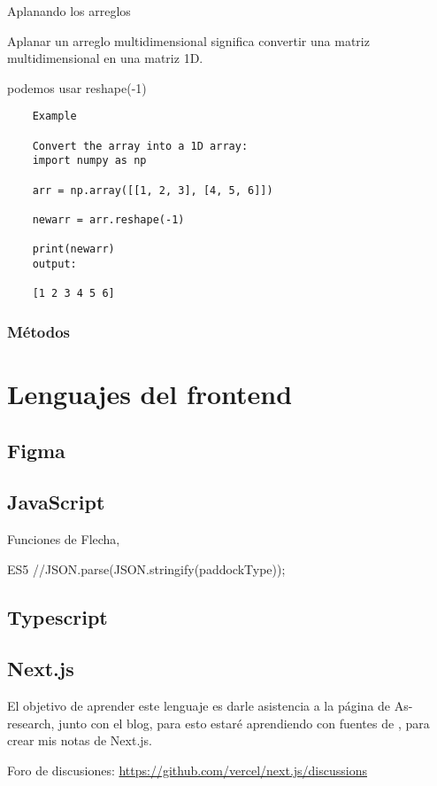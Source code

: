 Aplanando los arreglos

Aplanar un arreglo multidimensional significa convertir una matriz multidimensional en una matriz 1D.

podemos usar reshape(-1)

\begin{verbatim}
	Example
	
	Convert the array into a 1D array:
	import numpy as np
	
	arr = np.array([[1, 2, 3], [4, 5, 6]])
	
	newarr = arr.reshape(-1)
	
	print(newarr) 
	output:
	
	[1 2 3 4 5 6] 
\end{verbatim}
\section{M\'etodos}




\part{Lenguajes del frontend}

\chapter{Figma}

\chapter{JavaScript}


Funciones de Flecha, 

ES5 //JSON.parse(JSON.stringify(paddockType));

\chapter{Typescript}

\chapter{Next.js}

El objetivo de aprender este lenguaje es darle asistencia a la p\'agina de As-research, junto con el blog, para esto estar\'e aprendiendo con fuentes de \cite{NextJsCurso}, para crear mis notas de Next.js. 

Foro de discusiones: \url{https://github.com/vercel/next.js/discussions}

